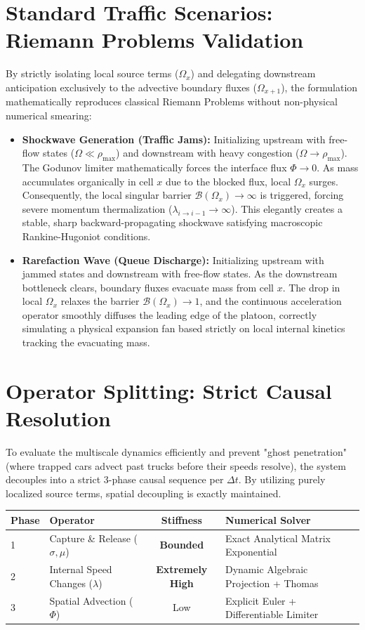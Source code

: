 \documentclass[11pt,a4paper]{article}
\begin{document}
\section{Standard Traffic Scenarios: Riemann Problems Validation}
By strictly isolating local source terms ($\Omega_x$) and delegating downstream anticipation exclusively to the advective boundary fluxes ($\Omega_{x+1}$), the formulation mathematically reproduces classical Riemann Problems without non-physical numerical smearing:
\begin{itemize}
    \item \textbf{Shockwave Generation (Traffic Jams):} Initializing upstream with free-flow states ($\Omega \ll \rho_{\max}$) and downstream with heavy congestion ($\Omega \to \rho_{\max}$). The Godunov limiter mathematically forces the interface flux $\Phi \to 0$. As mass accumulates organically in cell $x$ due to the blocked flux, local $\Omega_x$ surges. Consequently, the local singular barrier $\mathcal{B}(\Omega_{x}) \to \infty$ is triggered, forcing severe momentum thermalization ($\lambda_{i\to i-1} \to \infty$). This elegantly creates a stable, sharp backward-propagating shockwave satisfying macroscopic Rankine-Hugoniot conditions.
    \item \textbf{Rarefaction Wave (Queue Discharge):} Initializing upstream with jammed states and downstream with free-flow states. As the downstream bottleneck clears, boundary fluxes evacuate mass from cell $x$. The drop in local $\Omega_x$ relaxes the barrier $\mathcal{B}(\Omega_x) \rightarrow 1$, and the continuous acceleration operator smoothly diffuses the leading edge of the platoon, correctly simulating a physical expansion fan based strictly on local internal kinetics tracking the evacuating mass.
\end{itemize}

\section{Operator Splitting: Strict Causal Resolution}
To evaluate the multiscale dynamics efficiently and prevent "ghost penetration" (where trapped cars advect past trucks before their speeds resolve), the system decouples into a strict 3-phase causal sequence per $\Delta t$. By utilizing purely localized source terms, spatial decoupling is exactly maintained.

\begin{table}[h]
\centering
\begin{tabular}{llcl}
\toprule
\textbf{Phase} & \textbf{Operator} & \textbf{Stiffness} & \textbf{Numerical Solver} \\
\midrule
1 & Capture \& Release ($\sigma, \mu$) & \textbf{Bounded} & Exact Analytical Matrix Exponential \\
2 & Internal Speed Changes ($\lambda$) & \textbf{Extremely High} & Dynamic Algebraic Projection + Thomas \\
3 & Spatial Advection ($\Phi$) & Low & Explicit Euler + Differentiable Limiter \\
\bottomrule
\end{tabular}
\end{table}
\end{document}
